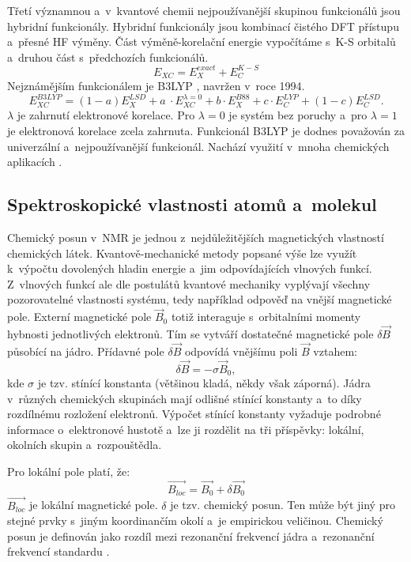 \documentclass[
digital, %
table,   %
lof,     %
lot,     %
oneside,
]{fithesis3}
\begin{document}
Třetí významnou a~v~kvantové chemii nejpoužívanější skupinou funkcionálů jsou hybridní funkcionály. Hybridní funkcionály jsou kombinací čistého DFT přístupu a~přesné HF výměny. Část výměně-korelační energie vypočítáme s~K-S orbitalů a~druhou část s~předchozích funkcionálů.
\begin{equation}
E_{XC} = E_{X}^{exact} + E_C^{K-S}
\end{equation}
Nejznámějším funkcionálem je B3LYP \cite{b3lyp}, navržen v~roce 1994.
\begin{equation}
E_{XC}^{B3LYP} = (1-a)E_{X}^{LSD} + a~\cdot E_{XC}^{\lambda = 0} + b \cdot E_{X}^{B88} + c \cdot E_{C}^{LYP} + (1-c)E_{C}^{LSD}.
\end{equation}
$\lambda$ je zahrnutí elektronové korelace. Pro $\lambda=0$ je systém bez poruchy a~pro $\lambda=1$ je elektronová korelace zcela zahrnuta. Funkcionál B3LYP je dodnes považován za univerzální a~nejpoužívanější funkcionál. Nachází využití v~mnoha chemických aplikacích \cite{koch2000chemist}.

\subsection{Spektroskopické vlastnosti atomů a~molekul}
Chemický posun v~NMR je jednou z~nejdůležitějších magnetických vlastností chemických látek. Kvantově-mechanické metody popsané výše lze využít k~výpočtu dovolených hladin energie a~jim odpovídajících vlnových funkcí. Z~vlnových funkcí ale dle postulátů kvantové mechaniky vyplývají všechny pozorovatelné vlastnosti systému, tedy například odpověď na vnější magnetické pole. Externí magnetické pole $\vec{B}_0$ totiž interaguje s~orbitalními momenty hybnosti jednotlivých elektronů. Tím se vytváří dostatečné magnetické pole $\delta \vec{B}$ působící na jádro. Přídavné pole $\delta \vec{B}$ odpovídá vnějšímu poli $\vec{B}$ vztahem:
\begin{equation}
\delta \vec{B} = - \sigma \vec{B}_0,
\end{equation}
kde $\sigma$ je tzv. stínící konstanta (většinou kladá, někdy však záporná). Jádra v~různých chemických skupinách mají odlišné stínící konstanty  a~to díky rozdílnému rozložení elektronů. Výpočet stínící konstanty vyžaduje podrobné informace o~elektronové hustotě a~lze ji rozdělit na tři příspěvky: lokální, okolních skupin a~rozpouštědla.

Pro lokální pole platí, že:
\begin{equation}
\vec{B_{loc}} = \vec{B_0} + \delta \vec{B_0}
\end{equation}
$\vec{B_{loc}}$ je lokální magnetické pole. $\delta$ je tzv. chemický posun. Ten může být jiný pro stejné prvky s~jiným koordinančím okolí a~je empirickou veličinou. Chemický posun je definován jako rozdíl mezi rezonanční frekvencí jádra a~rezonanční frekvencí standardu \cite{atkins2010atkins}.
\end{document}
